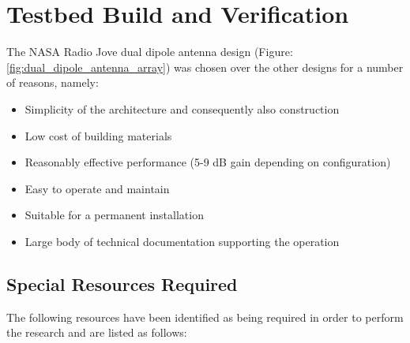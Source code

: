 \documentclass[runningheads,a4paper]{llncs}
\begin{document}
%
%
\newpage
\chapter*{Testbed Build and Verification}
The NASA Radio Jove dual dipole antenna design (Figure: \ref{fig:dual_dipole_antenna_array}) was chosen over the other designs for a number of reasons, namely:

\begin{itemize}
	\item Simplicity of the architecture and consequently also construction
	\item Low cost of building materials
	\item Reasonably effective performance (5-9 dB gain depending on configuration)
	\item Easy to operate and maintain
	\item Suitable for a permanent installation
	\item Large body of technical documentation supporting the operation
\end{itemize}


\section*{Special Resources Required}

The following resources have been identified as being required in order to perform the research and are listed as follows:
\end{document}
